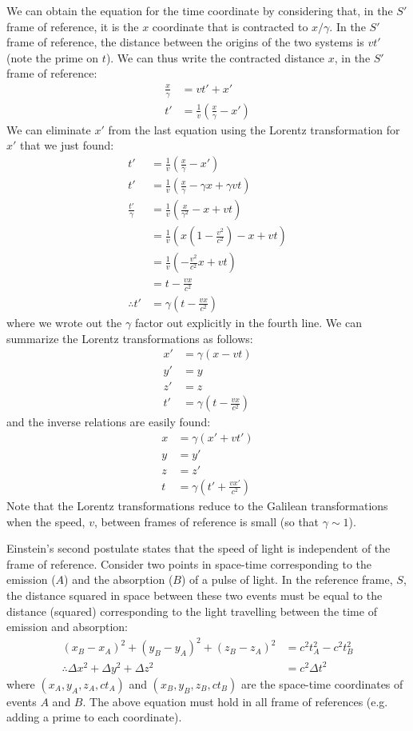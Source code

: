 We can obtain the equation for the time coordinate by considering that, in the $S'$ frame of reference, it is the $x$ coordinate that is contracted to $x/\gamma$. In the $S'$ frame of reference, the distance between the origins of the two systems is $vt'$ (note the prime on $t$). We can thus write the contracted distance $x$, in the $S'$ frame of reference:
\begin{align*}
\frac{x}{\gamma}&=vt'+x'\\
t'&= \frac{1}{v}\left(\frac{x}{\gamma}-x'\right)
\end{align*}
We can eliminate $x'$ from the last equation using the Lorentz transformation for $x'$ that we just found:
\begin{align*}
t'&= \frac{1}{v}\left(\frac{x}{\gamma}-x'\right)\\
t'&= \frac{1}{v}\left(\frac{x}{\gamma}-\gamma x+\gamma vt\right)\\
\frac{t'}{\gamma}&=\frac{1}{v}\left(\frac{x}{\gamma^2}-x+vt\right)\\
&=\frac{1}{v}\left(x\left(1-\frac{v^2}{c^2}\right)-x+vt\right)\\
&=\frac{1}{v}\left(-\frac{v^2}{c^2}x+vt\right)\\
&=t-\frac{vx}{c^2}\\
\therefore t'&=\gamma\left(t-\frac{vx}{c^2} \right)
\end{align*}
where we wrote out the $\gamma$ factor out explicitly in the fourth line. We can summarize the Lorentz transformations as follows:
\begin{align*}
x' &=\gamma (x-vt)\\
y' &= y\\
z' &= z\\
t' &=\gamma\left(t-\frac{vx}{c^2} \right)
\end{align*}
and the inverse relations are easily found:
\begin{align*}
x &=\gamma (x'+vt')\\
y &= y'\\
z &= z'\\
t &=\gamma\left(t'+\frac{vx'}{c^2} \right)
\end{align*}
Note that the Lorentz transformations reduce to the Galilean transformations when the speed, $v$, between frames of reference is small (so that $\gamma \sim 1$).

Einstein's second postulate states that the speed of light is independent of the frame of reference. Consider two points in space-time corresponding to the emission ($A$) and the absorption ($B$) of a pulse of light. In the reference frame, $S$, the distance squared in space between these two events must be equal to the distance (squared) corresponding to the light travelling between the time of emission and absorption:
\begin{align*}
(x_B-x_A)^2+(y_B-y_A)^2+(z_B-z_A)^2&= c^2t_A^2-c^2t_B^2\\
\therefore \Delta x^2 + \Delta y^2 +\Delta z^2&=c^2\Delta t^2
\end{align*}
where $(x_A,y_A,z_A,ct_A)$ and $(x_B,y_B,z_B,ct_B)$ are the space-time coordinates of events $A$ and $B$. The above equation must hold in all frame of references (e.g. adding a prime to each coordinate).

